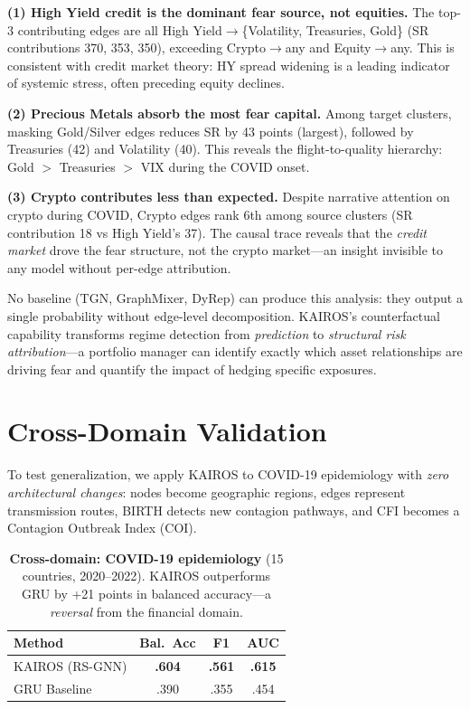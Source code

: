 \documentclass[11pt]{article}
\begin{document}
\textbf{(1) High Yield credit is the dominant fear source, not equities.} The top-3 contributing edges are all High Yield$\to$\{Volatility, Treasuries, Gold\} (SR contributions 370, 353, 350), exceeding Crypto$\to$any and Equity$\to$any. This is consistent with credit market theory: HY spread widening is a leading indicator of systemic stress, often preceding equity declines.

\textbf{(2) Precious Metals absorb the most fear capital.} Among target clusters, masking Gold/Silver edges reduces SR by 43 points (largest), followed by Treasuries (42) and Volatility (40). This reveals the flight-to-quality hierarchy: Gold $>$ Treasuries $>$ VIX during the COVID onset.

\textbf{(3) Crypto contributes less than expected.} Despite narrative attention on crypto during COVID, Crypto edges rank 6th among source clusters (SR contribution 18 vs High Yield's 37). The causal trace reveals that the \emph{credit market} drove the fear structure, not the crypto market---an insight invisible to any model without per-edge attribution.

No baseline (TGN, GraphMixer, DyRep) can produce this analysis: they output a single probability without edge-level decomposition. KAIROS's counterfactual capability transforms regime detection from \emph{prediction} to \emph{structural risk attribution}---a portfolio manager can identify exactly which asset relationships are driving fear and quantify the impact of hedging specific exposures.

\section{Cross-Domain Validation}

To test generalization, we apply KAIROS to COVID-19 epidemiology with \emph{zero architectural changes}: nodes become geographic regions, edges represent transmission routes, BIRTH detects new contagion pathways, and CFI becomes a Contagion Outbreak Index (COI).

\begin{table}[h]
\centering
\caption{\textbf{Cross-domain: COVID-19 epidemiology} (15 countries, 2020--2022). KAIROS outperforms GRU by +21 points in balanced accuracy---a \emph{reversal} from the financial domain.}
\label{tab:epi}
\small
\begin{tabular}{lccc}
\toprule
\textbf{Method} & \textbf{Bal.\ Acc} & \textbf{F1} & \textbf{AUC} \\
\midrule
KAIROS (RS-GNN) & \textbf{.604} & \textbf{.561} & \textbf{.615} \\
GRU Baseline    & .390          & .355          & .454          \\
\bottomrule
\end{tabular}
\end{table}
\end{document}
